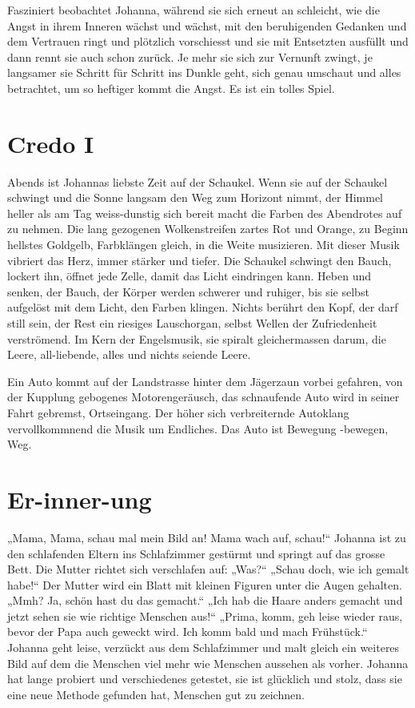 Fasziniert beobachtet Johanna, während sie sich erneut an schleicht, wie die Angst in ihrem Inneren wächst und wächst, mit den beruhigenden Gedanken und dem Vertrauen ringt und plötzlich vorschiesst und sie mit Entsetzten ausfüllt und dann rennt sie auch schon zurück. Je mehr sie sich zur Vernunft zwingt, je langsamer sie Schritt für Schritt ins Dunkle geht, sich genau umschaut und alles betrachtet, um so heftiger kommt die Angst.
Es ist ein tolles Spiel.



\section*{Credo I}



Abends ist Johannas liebste Zeit auf der Schaukel. Wenn sie auf der Schaukel schwingt und die  Sonne langsam den Weg zum Horizont nimmt, der Himmel heller als am Tag weiss-dunstig sich bereit macht die Farben des Abendrotes auf zu nehmen. Die lang gezogenen Wolkenstreifen zartes Rot und Orange, zu Beginn hellstes Goldgelb, Farbklängen gleich, in die Weite musizieren. Mit dieser Musik vibriert das Herz, immer stärker und tiefer. Die Schaukel schwingt den Bauch, lockert ihn, öffnet jede Zelle, damit das Licht eindringen kann. Heben und senken, der Bauch, der Körper werden schwerer und ruhiger, bis sie selbst aufgelöst mit dem Licht, den Farben klingen. 
Nichts berührt den Kopf, der darf still sein, der Rest ein riesiges Lauschorgan, selbst Wellen der Zufriedenheit verströmend. Im Kern der Engelsmusik, sie spiralt gleichermassen darum, die Leere, all-liebende, alles und nichts seiende Leere.

Ein Auto kommt auf der Landstrasse hinter dem Jägerzaun vorbei gefahren, von der Kupplung gebogenes Motorengeräusch, das schnaufende Auto wird in seiner Fahrt gebremst, Ortseingang. Der höher sich verbreiternde Autoklang vervollkommnend die Musik um Endliches. Das Auto ist Bewegung -bewegen, Weg.
 


\section*{Er-inner-ung}



„Mama, Mama, schau mal mein Bild an! Mama wach auf, schau!“ Johanna ist zu den schlafenden Eltern ins Schlafzimmer gestürmt und springt auf das grosse Bett. Die Mutter richtet sich verschlafen auf: „Was?“ „Schau doch, wie ich gemalt habe!“ Der Mutter wird ein Blatt mit kleinen Figuren unter die Augen gehalten. „Mmh? Ja, schön hast du das gemacht.“ „Ich hab die Haare anders gemacht und jetzt sehen sie wie richtige Menschen aus!“ „Prima, komm, geh leise wieder raus, bevor der Papa auch geweckt wird. Ich komm bald und mach Frühstück.“ Johanna geht leise, verzückt aus dem Schlafzimmer und malt gleich ein weiteres Bild auf dem die Menschen viel mehr wie Menschen aussehen als vorher. Johanna hat lange probiert und verschiedenes getestet, sie ist glücklich und stolz, dass sie eine neue Methode gefunden hat, Menschen gut zu zeichnen.

